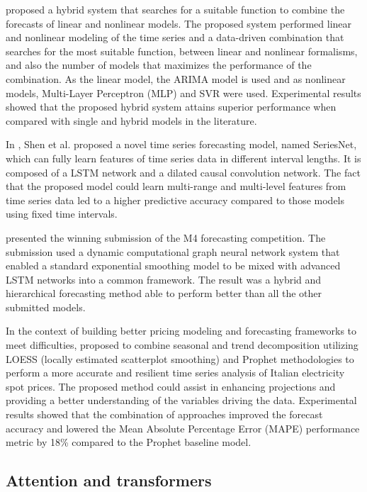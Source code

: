 \cite{DEOSANTOSJUNIOR201972} proposed a hybrid system that searches for a suitable function to combine the forecasts of linear and nonlinear models.
The proposed system performed linear and nonlinear modeling of the time series and a data-driven combination that searches for the most suitable function, between linear and nonlinear formalisms, and also the number of models that maximizes the performance of the combination.
As the linear model, the ARIMA model is used and as nonlinear models, Multi-Layer Perceptron (MLP) and SVR were used.
Experimental results showed that the proposed hybrid system attains superior performance when compared with single and hybrid models in the literature.

In \cite{SHEN2020302}, Shen et al. proposed a novel time series forecasting model, named SeriesNet, which can fully learn features of time series data in different interval lengths.
It is composed of a LSTM network and a dilated causal convolution network.
The fact that the proposed model could learn multi-range and multi-level features from time series data led to a higher predictive accuracy compared to those models using fixed time intervals.

\cite{SMYL202075} presented the winning submission of the M4 forecasting competition.
The submission used a dynamic computational graph neural network system that enabled a standard exponential smoothing model to be mixed with advanced LSTM networks into a common framework.
The result was a hybrid and hierarchical forecasting method able to perform better than all the other submitted models.

In the context of building better pricing modeling and forecasting frameworks to meet difficulties, \cite{en16031371} proposed to combine seasonal and trend decomposition utilizing LOESS (locally estimated scatterplot smoothing) and Prophet methodologies to perform a more accurate and resilient time series analysis of Italian electricity spot prices.
The proposed method could assist in enhancing projections and providing a better understanding of the variables driving the data.
Experimental results showed that the combination of approaches improved the forecast accuracy and lowered the Mean Absolute Percentage Error (MAPE) performance metric by 18\% compared to the Prophet baseline model.


\vspace{0.1 cm}
\subsection{Attention and transformers}
\label{sec:transformers}
\vspace{0.1 cm}

